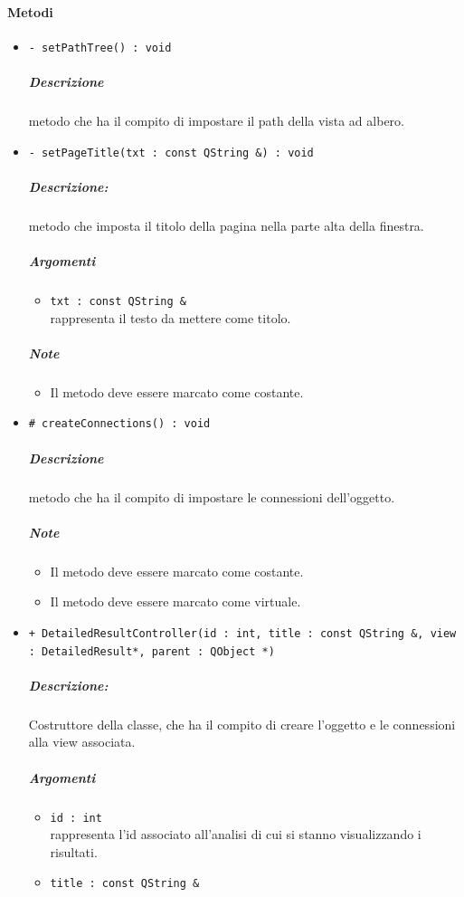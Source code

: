	\paragraph{\color{black}Metodi}
		\begin{itemize}
			\item \color{blue} \verb!- setPathTree() : void!
			\color{black}
			\subparagraph{Descrizione} metodo che ha il compito di impostare  il path della vista ad albero.
			\item \color{blue} \verb!- setPageTitle(txt : const QString &) : void!
			\color{black}
			\subparagraph{Descrizione:} metodo che imposta il titolo della pagina nella parte alta della finestra.
			\color{black}
			\subparagraph{Argomenti}
			\begin{itemize}
				\item \color{RoyalPurple} \verb!txt : const QString &!\\				
\color{black} rappresenta il testo da mettere come titolo.
			\end{itemize}
			\subparagraph{Note}
			\begin{itemize}
				\item Il metodo deve essere marcato come costante.
			\end{itemize}
			\item \color{blue} \verb!# createConnections() : void!
			\color{black}
			\subparagraph{Descrizione} metodo che ha il compito di impostare le connessioni dell'oggetto.
			\subparagraph{Note}
			\begin{itemize}
				\item Il metodo deve essere marcato come costante.
				\item Il metodo deve essere marcato come virtuale.
			\end{itemize}
			\item \color{blue} \verb!+ DetailedResultController(id : int, title : const QString &, view : DetailedResult*, parent : QObject *)!
			\color{black}
			\subparagraph{Descrizione:} Costruttore della classe, che ha il compito di creare l'oggetto e le connessioni alla view associata.
			\color{black}
			\subparagraph{Argomenti}
			\begin{itemize}
				\item \color{RoyalPurple} \verb!id : int!\\				
\color{black} rappresenta l'id associato all'analisi di cui si stanno visualizzando i risultati.
				\item \color{RoyalPurple} \verb!title : const QString &!\\				

\end{itemize}
\end{itemize}
